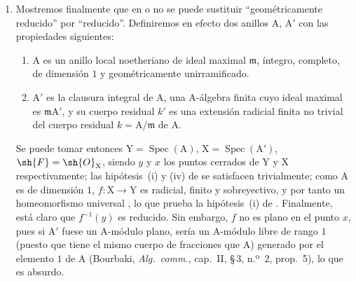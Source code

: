 \begin{remarks}[15.2.4]
\begin{enumerate}[label=(\roman*)]
El único punto $x$ de $\mathrm{X}$ situado sobre el punto $y$ correspondiente al ideal maximal $(s)+(t)$ corresponde al ideal maximal $(u)$; pero, como la clase $\bar{u}$ de $u$ en $\sh{O}_x/\mathfrak{m}_y\sh{O}_x$ satisface $\bar{u}^2=0$, $f^{-1}(y)$ no es un $\boldsymbol{k}(y)$-preesquema reducido.
Aquí $f$ es un morfismo finito, sobreyectivo y radicial, y por tanto un homeomorfismo universal , pero no es plano en el punto $x$, pues si $\sh{O}_x$ fuese un $\sh{O}_y$-módulo plano, sería un $\sh{O}_y$-módulo
libre de rango $1$ generado por el elemento $1$ de $\sh{O}_x$ (Bourbaki, \emph{Alg.\ comm.}, cap.~II, \S\,3, n.º~2, prop.~5), lo que es absurdo.
  \item Mostremos finalmente que en  o  no se puede sustituir ``geométricamente reducido'' por ``reducido''.
Definiremos en efecto dos anillos $\mathrm{A}$, $\mathrm{A}'$ con las propiedades siguientes:
\begin{enumerate}[label=\arabic*)]
  \item $\mathrm{A}$ es un anillo local noetheriano de ideal maximal $\mathfrak{m}$, íntegro, completo, de dimensión $1$ y geométricamente unirramificado.
  \item $\mathrm{A}'$ es la clausura integral de $\mathrm{A}$, una $\mathrm{A}$-álgebra finita cuyo ideal maximal es $\mathfrak{m}\mathrm{A}'$, y su cuerpo residual $k'$ es una extensión radicial finita no trivial del cuerpo residual $k=\mathrm{A}/\mathfrak{m}$ de $\mathrm{A}$.
\end{enumerate}
Se puede tomar entonces $\mathrm{Y}=\operatorname{Spec}(\mathrm{A})$, $\mathrm{X}=\operatorname{Spec}(\mathrm{A}')$, $\sh{F}=\sh{O}_\mathrm{X}$, siendo $y$ y $x$ los puntos cerrados de $\mathrm{Y}$ y $\mathrm{X}$ respectivamente; las hipótesis~(i) y (iv) de  se satisfacen trivialmente; como $\mathrm{A}$ es de dimensión $1$, $f:\mathrm{X}\to\mathrm{Y}$ es radicial, finito y sobreyectivo, y por tanto un homeomorfismo universal , lo que prueba la hipótesis~(i) de .
Finalmente, está claro que $f^{-1}(y)$ es reducido.
Sin embargo, $f$ no es plano en el punto $x$, pues si $\mathrm{A}'$ fuese un $\mathrm{A}$-módulo plano, sería un $\mathrm{A}$-módulo libre de rango $1$ (puesto que tiene el mismo cuerpo de fracciones que $\mathrm{A}$) generado por el elemento $1$ de $\mathrm{A}$ (Bourbaki, \emph{Alg.\ comm.}, cap.~II, \S\,3, n.º~2, prop.~5), lo que es absurdo.


\end{enumerate}
\end{remarks}
